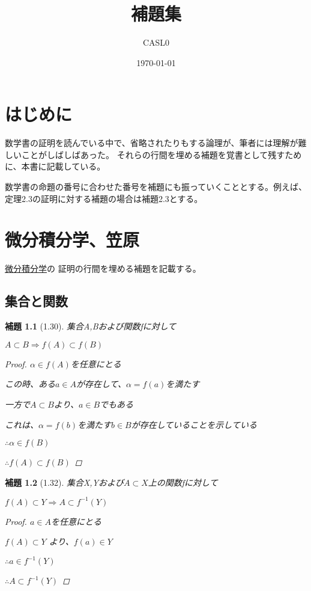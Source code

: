 \documentclass{book}
\title{補題集}
\author{CASL0}
\date{\today}
\newtheorem*{lemma}{補題}
\begin{document}
\maketitle

\frontmatter

\chapter*{はじめに}

数学書の証明を読んでいる中で、省略されたりもする論理が、筆者には理解が難しいことがしばしばあった。
それらの行間を埋める補題を覚書として残すために、本書に記載している。

数学書の命題の番号に合わせた番号を補題にも振っていくこととする。例えば、定理2.3の証明に対する補題の場合は補題2.3とする。

\tableofcontents

\mainmatter

\chapter{微分積分学、笠原}

\href{https://www.saiensu.co.jp/search/?isbn=978-4-7819-0108-4&y=1974}{微分積分学}の
証明の行間を埋める補題を記載する。

\section{集合と関数}

\begin{lemma}[1.30]
  集合A,Bおよび関数fに対して

  $A \subset B \Rightarrow f(A) \subset f(B)$

  \begin{proof}
    $\alpha \in f(A)$を任意にとる

    この時、ある$a \in A$が存在して、$\alpha = f(a)$を満たす

    一方で$A \subset B$より、$a \in B$でもある

    これは、$\alpha = f(b)$を満たす$b \in B$が存在していることを示している

    $\therefore \alpha \in f(B)$

    $\therefore f(A) \subset f(B)$
  \end{proof}
\end{lemma}

\begin{lemma}[1.32]
  集合X,Yおよび$A \subset X$上の関数fに対して

  $f(A) \subset Y \Rightarrow A \subset f^{-1}(Y)$

  \begin{proof}
    $a \in A$を任意にとる

    $f(A) \subset Y$ より、$f(a) \in Y$

    $\therefore a \in f^{-1}(Y)$

    $\therefore A \subset f^{-1}(Y)$
  \end{proof}
\end{lemma}
\end{document}
